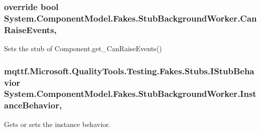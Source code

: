\hypertarget{class_system_1_1_component_model_1_1_fakes_1_1_stub_background_worker_a7f320053f4dcd3d2addb21aa81280a6f}{
\subsubsection[{Can\-Raise\-Events}]{\setlength{\rightskip}{0pt plus 5cm}override bool System.\-Component\-Model.\-Fakes.\-Stub\-Background\-Worker.\-Can\-Raise\-Events\hspace{0.3cm}{\ttfamily [get]}, {\ttfamily [protected]}}}\label{class_system_1_1_component_model_1_1_fakes_1_1_stub_background_worker_a7f320053f4dcd3d2addb21aa81280a6f}


Sets the stub of Component.\-get\-\_\-\-Can\-Raise\-Events()

\hypertarget{class_system_1_1_component_model_1_1_fakes_1_1_stub_background_worker_a112d56bfbf0f7bbc41d868fd9b1b8ecf}{
\subsubsection[{Instance\-Behavior}]{\setlength{\rightskip}{0pt plus 5cm}mqttf.\-Microsoft.\-Quality\-Tools.\-Testing.\-Fakes.\-Stubs.\-I\-Stub\-Behavior System.\-Component\-Model.\-Fakes.\-Stub\-Background\-Worker.\-Instance\-Behavior\hspace{0.3cm}{\ttfamily [get]}, {\ttfamily [set]}}}\label{class_system_1_1_component_model_1_1_fakes_1_1_stub_background_worker_a112d56bfbf0f7bbc41d868fd9b1b8ecf}


Gets or sets the instance behavior.

